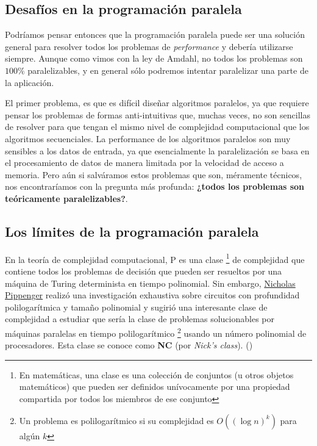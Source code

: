 \subsection{Desafíos en la programación paralela}

Podríamos pensar entonces que la programación paralela puede ser una solución general para resolver todos los problemas
de \textit{performance} y debería utilizarse siempre. Aunque como vimos con la ley de Amdahl, no todos los problemas son
$100\%$ paralelizables, y en general sólo podremos intentar paralelizar una parte de la aplicación.

El primer problema, es que es difícil diseñar algoritmos paralelos, ya que requiere pensar los problemas de formas
anti-intuitivas que, muchas veces, no son sencillas de resolver para que tengan el mismo nivel de complejidad
computacional que los algoritmos secuenciales. La performance de los algoritmos paralelos son muy sensibles a los datos
de entrada, ya que esencialmente la paralelización se basa en el procesamiento de datos de manera limitada por la
velocidad de acceso a memoria. Pero aún si salváramos estos problemas que son, méramente técnicos, nos encontraríamos
con la pregunta más profunda: \textbf{¿todos los problemas son teóricamente paralelizables?}.

\subsection{Los límites de la programación paralela}

En la teoría de complejidad computacional, P es una clase \footnote{En matemáticas, una clase es una colección de
conjuntos (u otros objetos matemáticos) que pueden ser definidos unívocamente por una propiedad compartida por todos los
miembros de ese conjunto} de complejidad que contiene todos los problemas de decisión que pueden ser resueltos por una
máquina de Turing determinista en tiempo polinomial. Sin embargo,
\href{https://en.wikipedia.org/wiki/Nick_Pippenger}{Nicholas Pippenger} realizó una investigación exhaustiva sobre
circuitos con profundidad polilogarítmica y tamaño polinomial y sugirió una interesante clase de complejidad a estudiar
que sería la clase de problemas solucionables por máquinas paralelas en tiempo polilogarítmico \footnote{Un problema es
polilogarítmico si su complejidad es $O((\log n)^k)$ para algún $k$} usando un número polinomial de procesadores. Esta
clase se conoce como \textbf{NC} (por \textit{Nick's class}). (\textcite{stockmeyer1987})

